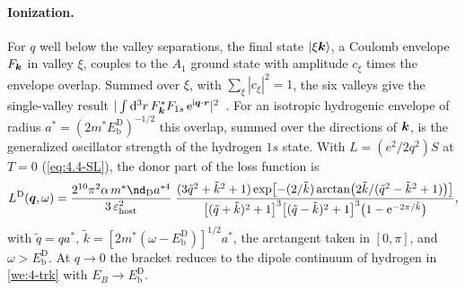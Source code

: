\paragraph{Ionization.} For $q$ well below the valley separations, the final state $|\xi\bm{k}\rangle$, a Coulomb envelope $F_{\bm{k}}$ in valley $\xi$, couples to the $A_1$ ground state with amplitude $c_\xi$ times the envelope overlap. Summed over $\xi$, with $\sum_\xi|c_\xi|^2 = 1$, the six valleys give the single-valley result $|\int\mathrm{d}^3r\,F_{\bm{k}}^*F_{1s}\,\mathrm{e}^{\mathrm{i}\bm{q}\cdot\bm{r}}|^2$~\cite[Eq.~(11)]{du2022doped}. For an isotropic hydrogenic envelope of radius $a^* = (2m^*E_{\mathrm{b}}^{\mathrm{D}})^{-1/2}$ this overlap, summed over the directions of $\bm{k}$, is the generalized oscillator strength of the hydrogen $1s$ state. With $L = (e^2/2q^2)S$ at $T = 0$ (\cref{eq:4.4-SL}), the donor part of the loss function is
\begin{equation}
  L^{\mathrm{D}}(\vect{q},\omega) = \frac{2^{10}\pi^2\alpha\,m^*\nd_{\mathrm{D}}a^{*4}}{3\,\varepsilon_{\mathrm{host}}^2}\;
  \frac{(3\tilde q^2 + \tilde k^2 + 1)\exp\bigl[-(2/\tilde k)\arctan\bigl(2\tilde k/(\tilde q^2 - \tilde k^2 + 1)\bigr)\bigr]}{\bigl[(\tilde q + \tilde k)^2 + 1\bigr]^3\bigl[(\tilde q - \tilde k)^2 + 1\bigr]^3\bigl(1 - \ee^{-2\pi/\tilde k}\bigr)} ,
  \label{eq:16.5-gos}
\end{equation}
with $\tilde q = qa^*$, $\tilde k = [2m^*(\omega - E_{\mathrm{b}}^{\mathrm{D}})]^{1/2}a^*$, the arctangent taken in $[0,\pi]$, and $\omega > E_{\mathrm{b}}^{\mathrm{D}}$. At $q \to 0$ the bracket reduces to the dipole continuum of hydrogen in \cref{we:4-trk} with $E_B \to E_{\mathrm{b}}^{\mathrm{D}}$.

